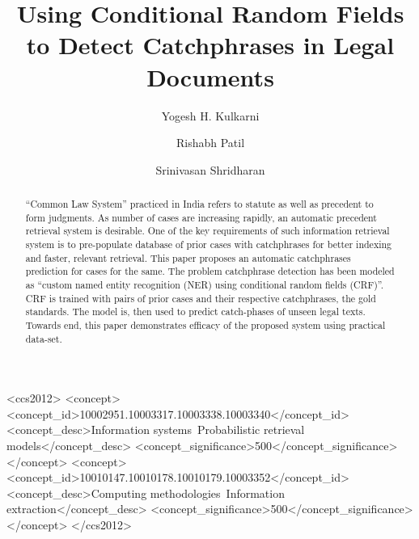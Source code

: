 \documentclass[sigconf]{acmart}
\begin{document}
\title{Using Conditional Random Fields to Detect Catchphrases in Legal Documents}


\author{Yogesh H. Kulkarni}

\author{Rishabh Patil}

\author{Srinivasan Shridharan}
\renewcommand{\shortauthors}{Yogesh Kulkarni et al.}


\begin{abstract}
``Common Law System'' practiced in India refers to statute as well as precedent to form judgments. As number of cases are increasing rapidly, an automatic precedent retrieval system is desirable. One of the key requirements of such information retrieval system is to pre-populate database of prior cases with catchphrases for better indexing and faster, relevant retrieval. This paper proposes an automatic catchphrases prediction for cases for the same. The problem catchphrase detection has been modeled as ``custom named entity recognition (NER) using conditional random fields (CRF)''. CRF is trained with pairs of prior cases and their respective catchphrases, the gold standards. The model is, then used to predict catch-phases of unseen legal texts.  Towards end, this paper demonstrates efficacy of the proposed system using practical data-set.
\end{abstract}

%
%
 \begin{CCSXML}
<ccs2012>
<concept>
<concept_id>10002951.10003317.10003338.10003340</concept_id>
<concept_desc>Information systems~Probabilistic retrieval models</concept_desc>
<concept_significance>500</concept_significance>
</concept>
<concept>
<concept_id>10010147.10010178.10010179.10003352</concept_id>
<concept_desc>Computing methodologies~Information extraction</concept_desc>
<concept_significance>500</concept_significance>
</concept>
</ccs2012>
\end{CCSXML}
\end{document}
